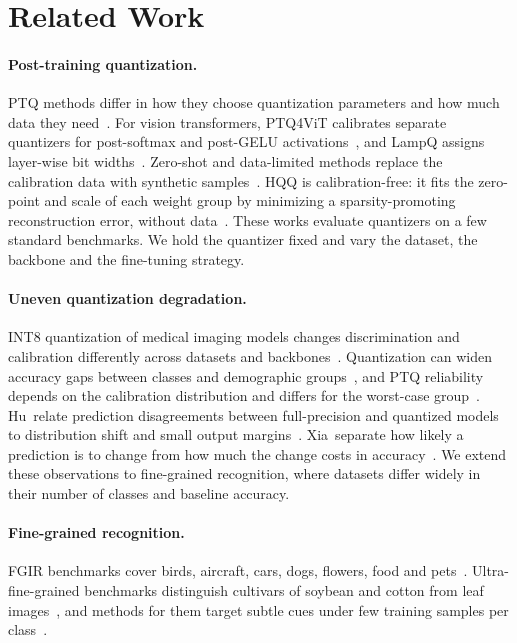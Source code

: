 \section{Related Work}
\label{sec:related}

\paragraph{Post-training quantization.}
PTQ methods differ in how they choose quantization parameters and how much data they need~\cite{gholami2021survey}.
For vision transformers, PTQ4ViT calibrates separate quantizers for post-softmax and post-GELU activations~\cite{yuan2022ptq4vit}, and LampQ assigns layer-wise bit widths~\cite{kim2026lampq}.
Zero-shot and data-limited methods replace the calibration data with synthetic samples~\cite{zhong2022fdda,kim2025synq}.
HQQ is calibration-free: it fits the zero-point and scale of each weight group by minimizing a sparsity-promoting reconstruction error, without data~\cite{badri2023hqq}.
These works evaluate quantizers on a few standard benchmarks.
We hold the quantizer fixed and vary the dataset, the backbone and the fine-tuning strategy.

\paragraph{Uneven quantization degradation.}
INT8 quantization of medical imaging models changes discrimination and calibration differently across datasets and backbones~\cite{ozdemir2026bridging}.
Quantization can widen accuracy gaps between classes and demographic groups~\cite{liu2025unfairness}, and PTQ reliability depends on the calibration distribution and differs for the worst-case group~\cite{yuan2023benchmarking}.
Hu~\etal relate prediction disagreements between full-precision and quantized models to distribution shift and small output margins~\cite{hu2023towards}.
Xia~\etal separate how likely a prediction is to change from how much the change costs in accuracy~\cite{xia2021underexplored}.
We extend these observations to fine-grained recognition, where datasets differ widely in their number of classes and baseline accuracy.

\paragraph{Fine-grained recognition.}
FGIR benchmarks cover birds, aircraft, cars, dogs, flowers, food and pets~\cite{wah2011cub,maji2013fine,krause2013cars,khosla2011dogs,nilsback2008flowers,bossard2014food,parkhi2012pets}.
Ultra-fine-grained benchmarks distinguish cultivars of soybean and cotton from leaf images~\cite{yu2021benchmark}, and methods for them target subtle cues under few training samples per class~\cite{fang2024learning}.

